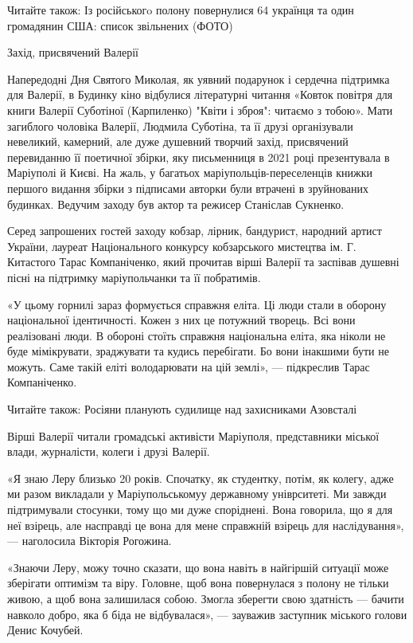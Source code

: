 Читайте також: Із російськогo полону повернулися 64 українця та один громадянин США: список звільнених (ФОТО)

Захід, присвячений Валерії

Напередодні Дня Святого Миколая, як уявний подарунок і сердечна підтримка для
Валерії, в Будинку кіно відбулися літературні читання «Ковток повітря для книги
Валерії Суботіної (Карпиленко) "Квіти і зброя": читаємо з тобою». Мати
загиблого чоловіка Валерії, Людмила Суботіна, та її друзі організували
невеликий, камерний, але дуже душевний творчий захід, присвячений перевиданню
її поетичної збірки, яку письменниця в 2021 році презентувала в Маріуполі й
Києві. На жаль, у багатьох маріупольців-переселенців книжки першого видання
збірки з підписами авторки були втрачені в зруйнованих будинках. Ведучим заходу
був актор та режисер Станіслав Сукненко. 

Серед запрошених гостей заходу кобзар, лірник, бандурист, народний артист
України, лауреат Національного конкурсу кобзарського мистецтва ім. Г. Китастого
Тарас Компаніченко, який прочитав вірші Валерії та заспівав душевні пісні на
підтримку маріупольчанки та її побратимів.

«У цьому горнилі зараз формується справжня еліта. Ці люди стали в оборону
національної ідентичності. Кожен з них це потужний творець. Всі вони
реалізовані люди. В обороні стоїть справжня національна еліта, яка ніколи не
буде мімікрувати, зраджувати та кудись перебігати. Бо вони інакшими бути не
можуть. Саме такій еліті володарювати на цій землі», — підкреслив Тарас
Компаніченко.

Читайте також: Росіяни планують судилище над захисниками Азовсталі

Вірші Валерії читали громадські активісти Маріуполя, представники міської
влади, журналісти, колеги і друзі Валерії.

«Я знаю Леру близько 20 років. Спочатку, як студентку, потім, як колегу, адже
ми разом викладали у Маріупольськомуу державному уніврситеті. Ми завжди
підтримували стосунки, тому що ми дуже споріднені. Вона говорила, що я для неї
взірець, але насправді це вона для мене справжній взірець для наслідування», —
наголосила Вікторія Рогожина.

«Знаючи Леру, можу точно сказати, що вона навіть в найгіршій ситуації може
зберігати оптимізм та віру. Головне, щоб вона повернулася з полону не тільки
живою, а щоб вона залишилася собою. Змогла зберегти свою здатність — бачити
навколо добро, яка б біда не відбувалася», — зауважив заступник міського голови
Денис Кочубей.

